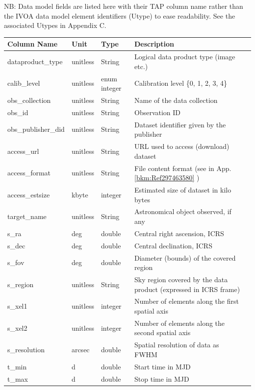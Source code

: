 \documentclass[11pt,a4paper]{ivoa}
\begin{document}
NB: Data model fields are listed here with their TAP column name rather than the IVOA data model element identifiers
(Utype) to ease readability.  See the associated Utypes in Appendix C. 

\begin{longtable}{|l|p{}|p{}|p{}|p{}|}
\hline
Column Name & Unit & Type & Description\\\hline
dataproduct\_type & unitless & String & Logical data product type (image etc.)\\\hline
calib\_level & unitless & enum integer  & Calibration level \{0, 1, 2, 3, 4\} \\\hline
obs\_collection & unitless & String & Name of the data collection \\\hline
obs\_id & unitless & String & Observation ID \\\hline
obs\_publisher\_did & unitless & String & Dataset identifier given by the publisher\\\hline
access\_url & unitless & String & URL used to access (download) dataset\\\hline
access\_format & unitless & String & File content format (see in App. \ref{bkm:Ref297463580} )\\\hline
access\_estsize & kbyte & integer & Estimated size of dataset in kilo bytes\\\hline
target\_name & unitless & String & Astronomical object observed, if any\\\hline
s\_ra & deg & double & Central right ascension, ICRS\\\hline
s\_dec & deg & double & Central declination, ICRS\\\hline
s\_fov & deg & double & Diameter (bounds) of the covered region \\\hline
s\_region & unitless & String & Sky region covered by the  data product (expressed in ICRS frame)\\\hline
s\_xel1 & unitless & integer & Number of elements along the first spatial axis\\\hline
s\_xel2 & unitless & integer & Number of elements along the second spatial axis\\\hline
s\_resolution & arcsec & double & Spatial resolution of data as FWHM\\\hline
t\_min & d & double & Start time in MJD\\\hline
t\_max & d & double & Stop time in MJD\\\hline

\end{longtable}
\end{document}

